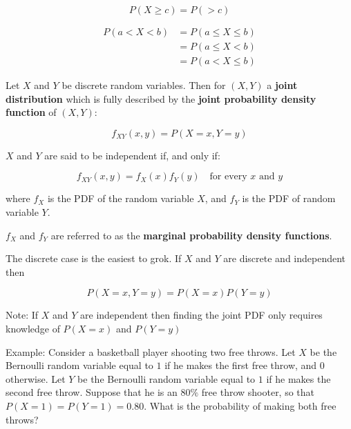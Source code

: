 \documentclass[11pt]{article}
\begin{document}
\begin{equation*}
P(X \geq c) = P( > c)
\end{equation*}


\begin{align*}
P(a < X < b) &= P(a \leq X \leq b) \\
             &= P(a \leq X < b)    \\
             &= P(a < X \leq b)
\end{align*}


\vspace{2mm}

Let $X$ and $Y$ be discrete random variables. Then for $(X,Y)$ a \textbf{joint distribution} which is
fully described by the \textbf{joint probability density function} of $(X,Y)$:

\begin{equation*}
f_{XY}(x, y) = P(X = x, Y = y)
\end{equation*} 

\vspace{2mm}

$X$ and $Y$ are said to be independent if, and only if:

\begin{equation*}
f_{XY}(x,y) = f_{X}(x) f_{Y}(y) \quad \mbox{for every $x$ and $y$}
\end{equation*}

where $f_{X}$ is the PDF of the random variable $X$, and $f_{Y}$ is the PDF of random variable $Y$.

\vspace{2mm}

$f_{X}$ and $f_{Y}$ are referred to as the \textbf{marginal probability density functions}.

\vspace{2mm}

The discrete case is the easiest to grok. If $X$ and $Y$ are discrete and independent then

\begin{equation*}
P(X=x, Y=y) = P(X=x)P(Y=y)
\end{equation*}

\vspace{2mm}

Note: If $X$ and $Y$ are independent then finding the joint PDF only requires knowledge of
$P(X=x)$ and $P(Y=y)$

\vspace{2mm}

Example: Consider a basketball player shooting two free throws. Let $X$ be the Bernoulli random variable
equal to $1$ if he makes the first free throw, and $0$ otherwise. Let $Y$ be the Bernoulli random
variable equal to $1$ if he makes the second free throw. Suppose that he is an $80\%$ free throw 
shooter, so that $P(X=1) = P(Y=1) = 0.80$. What is the probability of making both free throws?
\end{document}

